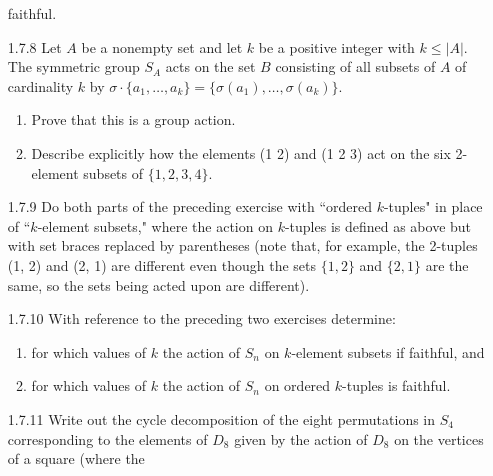 \begin{enumerate}
                  faithful.
   \item[1.7.8]   Let $A$ be a nonempty set and let $k$ be a positive integer
                  with $k \le |A|$. The symmetric group $S_A$ acts on the set
                  $B$ consisting of all subsets of $A$ of cardinality $k$ by
                  $\sigma \cdot \{a_1, \ldots, a_k\} = \{\sigma(a_1), \ldots,
                   \sigma(a_k)\}$.
                  \begin{enumerate}
                     \item Prove that this is a group action.
                     \item Describe explicitly how the elements (1 2) and
                           (1 2 3) act on the six 2-element subsets of
                           $\{1, 2, 3, 4\}$.
                  \end{enumerate}
   \item[1.7.9]   Do both parts of the preceding exercise with ``ordered
                  $k$-tuples" in place of ``$k$-element subsets," where the
                  action on $k$-tuples is defined as above but with set braces
                  replaced by parentheses (note that, for example, the 2-tuples
                  (1, 2) and (2, 1) are different even though the sets
                  $\{1, 2\}$ and $\{2, 1\}$ are the same, so the sets being
                  acted upon are different).
   \item[1.7.10]  With reference to the preceding two exercises determine:
                  \begin{enumerate}
                     \item for which values of $k$ the action of $S_n$ on
                           $k$-element subsets if faithful, and
                     \item for which values of $k$ the action of $S_n$ on
                           ordered $k$-tuples is faithful.
                  \end{enumerate}
   \item[1.7.11]  Write out the cycle decomposition of the eight permutations in
                  $S_4$ corresponding to the elements of $D_8$ given by the
                  action of $D_8$ on the vertices of a square (where the

\end{enumerate}

